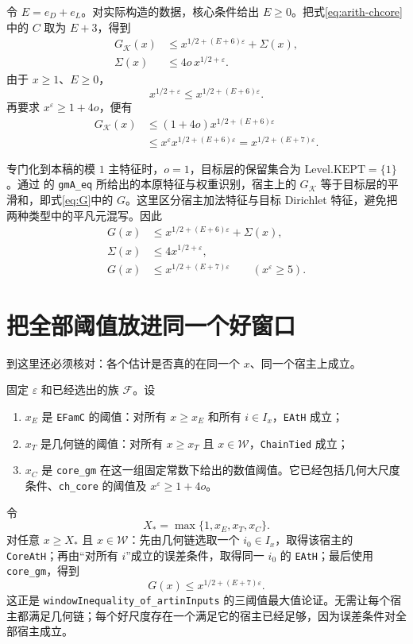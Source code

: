 令 $E=e_D+e_L$。对实际构造的数据，核心条件给出 $E\ge0$。把式\eqref{eq:arith-chcore}中的 $C$ 取为 $E+3$，得到
\begin{align}
G_{\mathcal K}(x)&\le x^{1/2+(E+6)\varepsilon}+\Sigma(x),\label{eq:arith-main-general}\\
\Sigma(x)&\le4o\,x^{1/2+\varepsilon}.
\end{align}
由于 $x\ge1$、$E\ge0$，
\[
x^{1/2+\varepsilon}\le x^{1/2+(E+6)\varepsilon}.
\]
再要求 $x^\varepsilon\ge1+4o$，便有
\begin{align*}
G_{\mathcal K}(x)
&\le(1+4o)x^{1/2+(E+6)\varepsilon}\\
&\le x^\varepsilon x^{1/2+(E+6)\varepsilon}
=x^{1/2+(E+7)\varepsilon}.
\end{align*}

专门化到本稿的模 $1$ 主特征时，$o=1$，目标层的保留集合为 $\mathrm{Level.KEPT}=\{1\}$。通过  的 \texttt{gmA\_eq} 所给出的本原特征与权重识别，宿主上的 $G_{\mathcal K}$ 等于目标层的平滑和，即式\eqref{eq:G}中的 $G$。这里区分宿主加法特征与目标 Dirichlet 特征，避免把两种类型中的平凡元混写。因此
\begin{align}
G(x)&\le x^{1/2+(E+6)\varepsilon}+\Sigma(x),\label{eq:arith-main}\\
\Sigma(x)&\le4x^{1/2+\varepsilon},\label{eq:arith-error}\\
G(x)&\le x^{1/2+(E+7)\varepsilon}\qquad(x^\varepsilon\ge5).
\label{eq:arith-final-numeric}
\end{align}


\section{把全部阈值放进同一个好窗口}
\label{sec:arith-thresholds}
到这里还必须核对：各个估计是否真的在同一个 $x$、同一个宿主上成立。

固定 $\varepsilon$ 和已经选出的族 $\mathcal F$。设
\begin{enumerate}
\item $x_E$ 是 \texttt{EFamC} 的阈值：对所有 $x\ge x_E$ 和所有 $i\in I_x$，\texttt{EAtH} 成立；
\item $x_T$ 是几何链的阈值：对所有 $x\ge x_T$ 且 $x\in\mathcal W$，\texttt{ChainTied} 成立；
\item $x_C$ 是 \texttt{core\_gm} 在这一组固定常数下给出的数值阈值。它已经包括几何大尺度条件、\texttt{ch\_core} 的阈值及 $x^\varepsilon\ge1+4o$。
\end{enumerate}
令
\[
X_* = \max\{1,x_E,x_T,x_C\}.
\]
对任意 $x\ge X_*$ 且 $x\in\mathcal W$：先由几何链选取一个 $i_0\in I_x$，取得该宿主的 \texttt{CoreAtH}；再由“对所有 $i$”成立的误差条件，取得同一 $i_0$ 的 \texttt{EAtH}；最后使用 \texttt{core\_gm}，得到
\[
G(x)\le x^{1/2+(E+7)\varepsilon}.
\]
这正是 \texttt{windowInequality\_of\_artinInputs} 的三阈值最大值论证。无需让每个宿主都满足几何链；每个好尺度存在一个满足它的宿主已经足够，因为误差条件对全部宿主成立。

